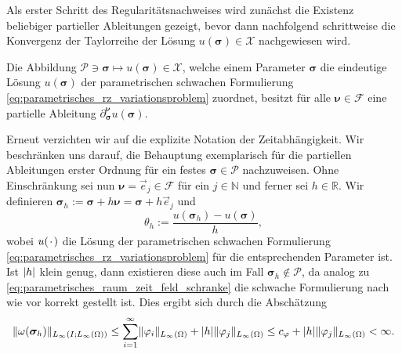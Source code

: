 \documentclass[../main.tex]{subfiles}
\begin{document}
Als erster Schritt des Regularitätsnachweises wird zunächst die Existenz beliebiger partieller Ableitungen gezeigt, bevor dann nachfolgend schrittweise die Konvergenz der Taylorreihe der Lösung $u(\bm \sigma) \in \mathcal X$ nachgewiesen wird.

\begin{Satz}
\label{satz:existenz_partieller_ableitungen}
    Die Abbildung $\mathcal P \ni \bm\sigma \mapsto u(\bm\sigma) \in \mathcal X$, welche einem Parameter $\bm\sigma$ die eindeutige Lösung $u(\bm\sigma)$ der parametrischen schwachen Formulierung \cref{eq:parametrisches_rz_variationsproblem} zuordnet, besitzt für alle $\bm\nu \in \mathcal F$ eine partielle Ableitung $\partial^{\bm\nu}_{\bm\sigma} u(\bm\sigma)$.

    \begin{Beweis}
        Erneut verzichten wir auf die explizite Notation der Zeitabhängigkeit.
        Wir beschränken uns darauf, die Behauptung exemplarisch für die partiellen Ableitungen erster Ordnung für ein festes $\bm\sigma \in \mathcal P$ nachzuweisen.
        Ohne Einschränkung sei nun $\bm\nu = \vec{e}_{j} \in \mathcal F$ für ein $j \in \mathbb{N}$ und ferner sei $h \in \mathbb{R}$.
        Wir definieren $\bm\sigma_{h} := \bm\sigma + h \bm\nu = \bm\sigma + h \vec e_{j}$ und
        \begin{equation}
            \theta_{h} := \frac{u(\bm\sigma_{h}) - u(\bm\sigma)}{h},
        \end{equation}
        wobei $u({\mkern2mu\cdot\mkern2mu})$ die Lösung der parametrischen schwachen Formulierung \cref{eq:parametrisches_rz_variationsproblem} für die entsprechenden Parameter ist.
        Ist $\lvert h\rvert$ klein genug, dann existieren diese auch im Fall $\bm\sigma_{h} \not\in \mathcal P$, da analog zu \cref{eq:parametrisches_raum_zeit_feld_schranke} die schwache Formulierung nach wie vor korrekt gestellt ist.
        Dies ergibt sich durch die Abschätzung
        \begin{equation}
            \lVert\omega(\bm \sigma_{h})\rVert_{L_{\infty}(I; L_{\infty}(\Omega))} \leq \sum_{i = 1}^{\infty} \lVert\varphi_{i}\rVert_{L_{\infty}(\Omega)} + \lvert h\rvert \lVert\varphi_{j}\rVert_{L_{\infty}(\Omega)}\leq c_{\varphi} + \lvert h\rvert \lVert\varphi_{j}\rVert_{L_{\infty}(\Omega)} < \infty.
        \end{equation}


\end{Beweis}
\end{Satz}
\end{document}
